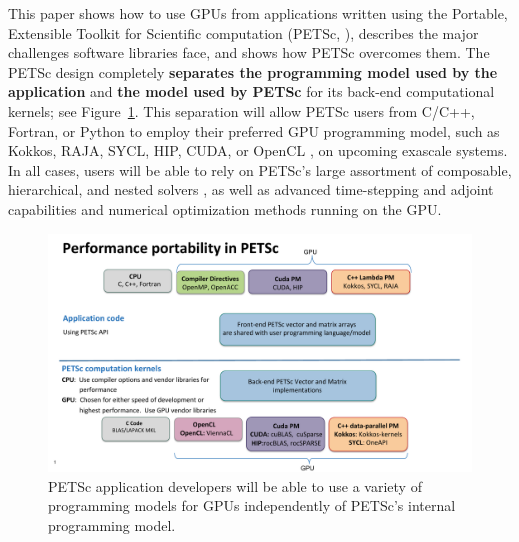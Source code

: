 \documentclass[5p,times]{elsarticle}
\begin{document}
This paper shows how to use GPUs from applications written using the
Portable, Extensible Toolkit for Scientific computation (PETSc,
\cite{petsc-user-ref}), describes
 the major challenges software libraries face, and shows how PETSc overcomes them.
The PETSc design completely {\bf separates the programming
model used by the application} and {\bf the model used by PETSc}
for its back-end computational kernels; see
Figure~\ref{fig:petsc_accel_support}.
This separation  will allow PETSc users from C/C++, Fortran, or Python to employ their preferred 
GPU programming model, such as Kokkos, RAJA, SYCL, HIP, CUDA, 
or OpenCL \cite{KOKKOS,RAJA,SYCL,CUDA,HIP,OPENCL}, on 
upcoming exascale systems.
%  
In all cases, users will be able to rely on PETSc's large assortment of composable, hierarchical, and nested
solvers \cite{bkmms2012}, as well as advanced time-stepping and adjoint
capabilities and numerical optimization methods running on the GPU.

\begingroup
\captionsetup[figure]{skip=0pt,belowskip=0pt}
\begin{figure}[H]
\begin{center}
\includegraphics[width=1.0\linewidth]{PETSc-Diagrams_v3.pdf}
\caption{PETSc application developers will be able to use a variety of programming models for GPUs independently of PETSc's internal programming model.}
\label{fig:petsc_accel_support}
\end{center}
\end{figure}
\endgroup
\vskip-10pt
\end{document}
